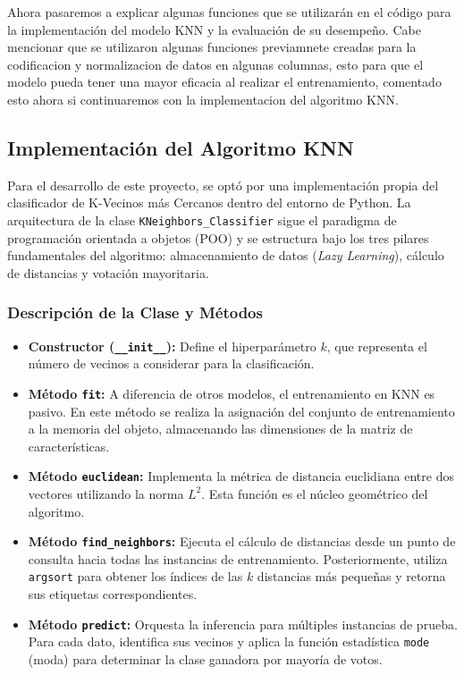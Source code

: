 \documentclass[12pt]{article}
\begin{document}
Ahora pasaremos a explicar algunas funciones que se utilizarán en el código para la implementación del modelo KNN y la evaluación de su desempeño. Cabe mencionar que se utilizaron algunas funciones previamnete creadas para la codificacion y normalizacion de datos en algunas columnas, esto para que el modelo pueda tener una mayor eficacia al realizar el entrenamiento, comentado esto ahora si continuaremos con la implementacion del algoritmo KNN.


\subsection{Implementación del Algoritmo KNN}

Para el desarrollo de este proyecto, se optó por una implementación propia del clasificador de K-Vecinos más Cercanos dentro del entorno de Python. La arquitectura de la clase \texttt{KNeighbors\_Classifier} sigue el paradigma de programación orientada a objetos (POO) y se estructura bajo los tres pilares fundamentales del algoritmo: almacenamiento de datos (\textit{Lazy Learning}), cálculo de distancias y votación mayoritaria.

\subsubsection{Descripción de la Clase y Métodos}

\begin{itemize}
    \item \textbf{Constructor (\texttt{\_\_init\_\_}):} Define el hiperparámetro $k$, que representa el número de vecinos a considerar para la clasificación.
    \item \textbf{Método \texttt{fit}:} A diferencia de otros modelos, el entrenamiento en KNN es pasivo. En este método se realiza la asignación del conjunto de entrenamiento a la memoria del objeto, almacenando las dimensiones de la matriz de características.
    \item \textbf{Método \texttt{euclidean}:} Implementa la métrica de distancia euclidiana entre dos vectores utilizando la norma $L^2$. Esta función es el núcleo geométrico del algoritmo.
    \item \textbf{Método \texttt{find\_neighbors}:} Ejecuta el cálculo de distancias desde un punto de consulta hacia todas las instancias de entrenamiento. Posteriormente, utiliza \texttt{argsort} para obtener los índices de las $k$ distancias más pequeñas y retorna sus etiquetas correspondientes.
    \item \textbf{Método \texttt{predict}:} Orquesta la inferencia para múltiples instancias de prueba. Para cada dato, identifica sus vecinos y aplica la función estadística \texttt{mode} (moda) para determinar la clase ganadora por mayoría de votos.
\end{itemize}
\end{document}
